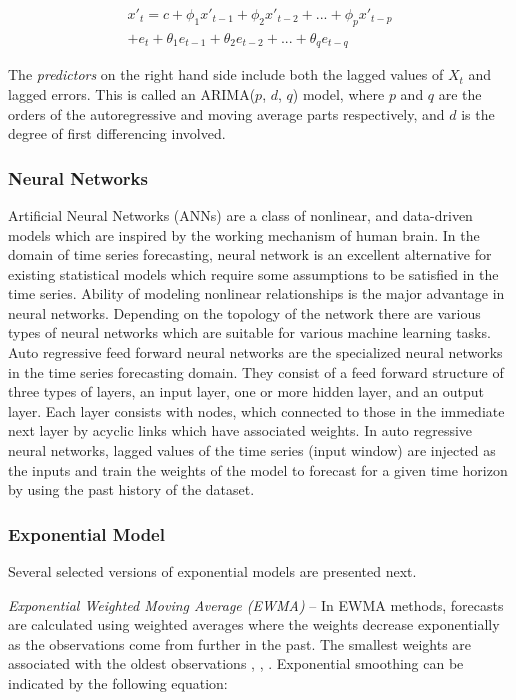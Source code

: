 \begin{equation}
\begin{split}
{x}'_t = c+ \phi_1{x}'_{ t-1} + \phi_2{x}'_{t-2} +...+ \phi_p{x}'_{t-p}\\ + e_{t} + \theta_1e_{ t-1} + \theta_2e_{t-2} +...+ \theta_qe_{t-q}
\end{split}
\end{equation}


The \textit{predictors} on the right hand side include both the lagged values of $X_t$ and lagged errors. This is called an ARIMA($p$, $d$, $q$) model, where $p$ and $q$ are the orders of the autoregressive and moving average parts respectively, and $d$ is the degree of first differencing involved.

\subsubsection{Neural Networks}
Artificial Neural Networks (ANNs) are a class of nonlinear, and data-driven models which are inspired by the working mechanism of human brain. In the domain of time series forecasting, neural network is an excellent alternative for existing statistical models which require some assumptions to be satisfied in the time series. Ability of modeling nonlinear relationships is the major advantage in neural networks. Depending on the topology of the network there are various types of neural networks which are suitable for various machine learning tasks. Auto regressive feed forward neural networks \cite{Forecasting_OTexts} are the specialized neural networks in the time series forecasting domain. They consist of a feed forward structure of three types of layers, an input layer, one or more hidden layer, and an output layer. Each layer consists with nodes, which connected to those in the immediate next layer by acyclic links which have associated weights. In auto regressive neural networks, lagged values of the time series (input window) are injected as the inputs and train the weights of the model to forecast for a given time horizon by using the past history of the dataset. 

\subsubsection{Exponential Model}
Several selected versions of exponential models are presented next.

\noindent
\textit{Exponential Weighted Moving Average (EWMA)} --
In EWMA methods, forecasts are calculated using weighted averages where the weights decrease exponentially as the observations come from further in the past. The smallest weights are associated with the oldest observations \cite{Forecasting_OTexts}, \cite{STAT510}, \cite{StatSoft}. Exponential smoothing can be indicated by the following equation:

